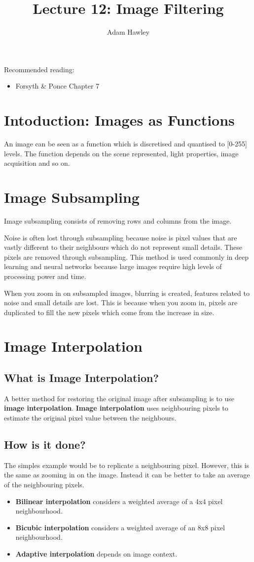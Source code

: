 \documentclass{article}
\author{Adam Hawley}
\title{Lecture 12: Image Filtering}
\begin{document}
\maketitle
Recommended reading:
\begin{itemize}
	\item Forsyth \& Ponce Chapter 7
\end{itemize}

\section{Intoduction: Images as Functions}
An image can be seen as a function which is discretised and quantised to [0-255] levels.
The function depends on the scene represented, light properties, image acquisition and so on.

\section{Image Subsampling}
Image subsampling consists of removing rows and columns from the image.

Noise is often lost through subsampling because noise is pixel values that are vastly different to their neighbours which do not represent small details.
These pixels are removed through subsampling.
This method is used commonly in deep learning and neural networks because large images require high levels of processing power and time.

When you zoom in on subsampled images, blurring is created, features related to noise and small details are lost.
This is because when you zoom in, pixels are duplicated to fill the new pixels which come from the increase in size.

\section{Image Interpolation}
\subsection{What is Image Interpolation?}
A better method for restoring the original image after subsampling is to use \textbf{image interpolation}.
\textbf{Image interpolation} uses neighbouring pixels to estimate the original pixel value between the neighbours.

\subsection{How is it done?}
The simples example would be to replicate a neighbouring pixel.
However, this is the same as zooming in on the image.
Instead it can be better to take an average of the neighbouring pixels.
\begin{itemize}
	\item \textbf{Bilinear interpolation} considers a weighted average of a 4x4 pixel neighbourhood.
	\item \textbf{Bicubic interpolation} considers a weighted average of an 8x8 pixel neighbourhood. 
	\item \textbf{Adaptive interpolation} depends on image context.
\end{itemize}
\end{document}
